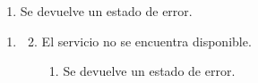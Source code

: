 \begin{framed}
\begin{description}
\begin{enumerate}
\begin {enumerate}
\begin{enumerate}
         \item Se devuelve un estado de error.
         \end{enumerate}
      \end{enumerate}
   \end{enumerate}
   \begin{enumerate} \itemsep1pt \parskip0pt 
   \setcounter{enumi}{3}
   \renewcommand{\labelenumi}{}
   \renewcommand{\labelenumiii}{\arabic{enumiii}.}
   \renewcommand{\labelenumii}{\arabic{enumi}\alph{enumii}.}
      \item 
      \begin {enumerate}
         \setcounter{enumii}{1}
         \item El servicio no se encuentra disponible.
         \begin{enumerate}
         \item Se devuelve un estado de error.
         \end{enumerate}
      \end{enumerate}
   \end{enumerate}
\end{description}
 \FloatBarrier
\end{framed}

